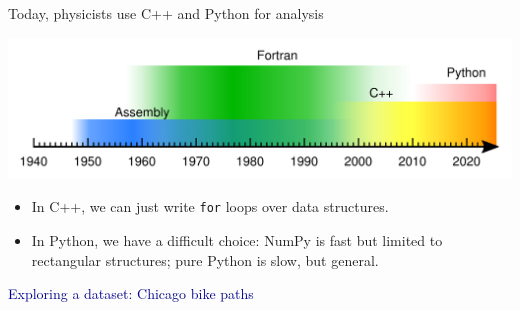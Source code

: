 \documentclass[aspectratio=169]{beamer}
\begin{document}
\begin{frame}{Today, physicists use C++ and Python for analysis}
\large
\vspace{0.25 cm}

\includegraphics[width=\linewidth]{img/programming-languages.pdf}

\vspace{0.2 cm}
\begin{itemize}\setlength{\itemsep}{0.2 cm}
\item<2-> In C++, we can just write \texttt{for} loops over data structures.
\item<3-> In Python, we have a difficult choice: NumPy is fast but limited to rectangular structures; pure Python is slow, but general.
\end{itemize}

\vspace{0.2 cm}
\Large
\begin{center}
\begin{minipage}{0.85\linewidth}
\begin{center}
\end{center}
\end{minipage}
\end{center}
\end{frame}

\begin{frame}{}
\Huge
\vspace{1 cm}
\begin{center}
\textcolor{darkblue}{Exploring a dataset: Chicago bike paths}
\end{center}
\end{frame}
\end{document}
